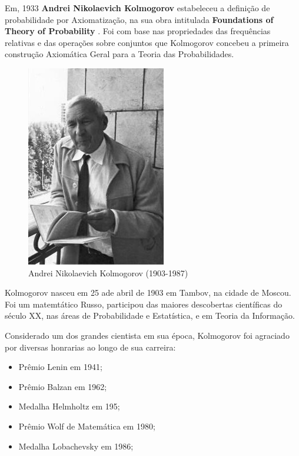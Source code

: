  \newpage
 \inic Em, 1933 \textbf{Andrei Nikolaevich Kolmogorov} estabeleceu a definição de probabilidade por Axiomatização, na sua obra intitulada \textbf{Foundations of Theory of Probability} . Foi com base nas propriedades das frequências relativas e das operações sobre conjuntos que Kolmogorov concebeu a primeira construção Axiomática Geral para a Teoria das Probabilidades.


\begin{figure}
    \centering
    \includegraphics[scale=0.5]{figures/Kolmogorov.jpeg}
    \caption{Andrei Nikolaevich Kolmogorov (1903-1987)}
    \label{fig:my_label10}
\end{figure}

Kolmogorov nasceu em 25 ade abril de 1903 em Tambov, na cidade de Moscou. Foi um matemtático Russo, participou das maiores descobertas científicas do século XX, nas áreas de Probabilidade e Estatística, e em Teoria da Informação.\vskip0.3cm

Considerado um dos grandes cientista em sua época, Kolmogorov foi agraciado por diversas honrarias ao longo de sua carreira:

\begin{itemize}
\item Prêmio Lenin em 1941;
\item Prêmio Balzan em 1962;
\item Medalha Helmholtz em 195;
\item Prêmio Wolf de Matemática em 1980;
\item Medalha Lobachevsky em 1986;
\end{itemize}










